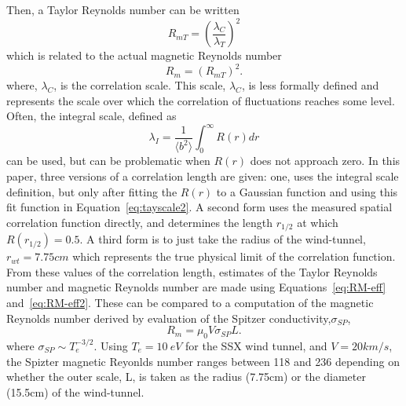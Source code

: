 \documentclass[aip,prl,amsmath,amssymb,reprint,superscriptaddress]{revtex4-1} %
\begin{document}
Then, a Taylor Reynolds number can be written~\cite{frisch95}
%
\begin{equation}
R_{mT}  = \left(\frac{\lambda_{C}}{\lambda_T} \right)^2
\label{eq:RM-eff}
\end{equation}
%
which is related to the actual magnetic Reynolds number
%
\begin{equation}
R_m  = \left( R_{mT} \right) ^2 .
\label{eq:RM-eff2}
\end{equation}
%
where, $\lambda_{C}$, is the correlation scale. This scale, $\lambda_{C}$, is less formally defined and represents the scale over which the correlation of fluctuations reaches some level. Often, the integral scale, defined as
%
\begin{equation}
\lambda_{I}  = \frac{1}{\langle b^2 \rangle} \int_0^\infty R(r) dr
\label{eq:tayscale2}
\end{equation}
%
can be used, but can be problematic when $R(r)$ does not approach zero. In this paper, three versions of a correlation length are given: one, uses the integral scale definition, but only after fitting the $R(r)$ to a Gaussian function and using this fit function in Equation~\ref{eq:tayscale2}. A second form uses the measured spatial correlation function directly, and determines the length $r_{1/2}$ at which $R(r_{1/2})=0.5$. A third form is to just take the radius of the wind-tunnel, $r_{wt} = 7.75cm$ which represents the true physical limit of the correlation function. From these values of the correlation length, estimates of the Taylor Reynolds number and magnetic Reynolds number are made using Equations~\ref{eq:RM-eff} and~\ref{eq:RM-eff2}. These can be compared to a computation of the magnetic Reynolds number derived by evaluation of the Spitzer conductivity,$\sigma_{SP}$,
\begin{equation}
R_m = \mu_0 V \sigma_{SP} L.
\label{eq:RM-calc} 
\end{equation}
%
where $\sigma_{SP}\sim T_{e}^{-3/2}$. Using $T_e = 10~eV$ for the SSX wind tunnel, and $V=20km/s$, the Spizter magnetic Reyonlds number ranges between 118 and 236 depending on whether the outer scale, L, is taken as the radius (7.75cm) or the diameter (15.5cm) of the wind-tunnel.
%
%
%
%
\end{document}
